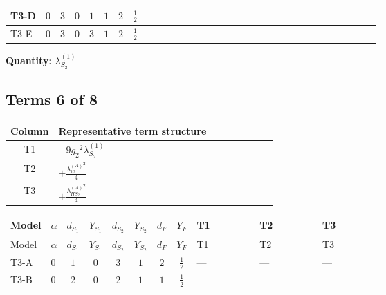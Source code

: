 \documentclass[8pt]{article}
\begin{document}
\begin{landscape}
\begin{longtable}{@{}llcccccc >{\raggedright\arraybackslash}p{0.21\linewidth} >{\raggedright\arraybackslash}p{0.21\linewidth} >{\raggedright\arraybackslash}p{0.21\linewidth}@{}}
\midrule
T3-D & $0$ & $3$ & $0$ & $1$ & $1$ & $2$ & $\frac{1}{2}$ & \scriptsize\adjustbox{max width=\linewidth}{$\begin{gathered} 8 {\lambda_{S_2}^{(1)}} T_{\nu}^{(2)}\end{gathered}$} & --- & --- \\
\midrule
T3-E & $0$ & $3$ & $0$ & $3$ & $1$ & $2$ & $\frac{1}{2}$ & --- & --- & --- \\
\midrule
\bottomrule
\end{longtable}
\clearpage
\noindent\textbf{Quantity: }$\lambda_{S_2}^{(1)}$\par\smallskip
\subsection*{Terms 6 of 8}
\begin{center}
\begin{tabular}{@{}c >{\raggedright\arraybackslash}p{0.82\linewidth}@{}}
\toprule
Column & Representative term structure \\
\midrule
T1 & \(\displaystyle -9 {g_2}^2 {\lambda_{S_2}^{(1)}}\) \\
\midrule
T2 & \(\displaystyle +\frac{{\lambda_{12}^{(A)}}^2}{4}\) \\
\midrule
T3 & \(\displaystyle +\frac{{\lambda_{HS_2}^{(A)}}^2}{4}\) \\
\midrule
\bottomrule
\end{tabular}
\end{center}
\smallskip
\tiny
\begin{longtable}{@{}llcccccc >{\raggedright\arraybackslash}p{0.21\linewidth} >{\raggedright\arraybackslash}p{0.21\linewidth} >{\raggedright\arraybackslash}p{0.21\linewidth}@{}}
\toprule
Model & $\alpha$ & $d_{S_1}$ & $Y_{S_1}$ & $d_{S_2}$ & $Y_{S_2}$ & $d_F$ & $Y_F$ & T1 & T2 & T3 \\
\midrule
\endfirsthead
\toprule
Model & $\alpha$ & $d_{S_1}$ & $Y_{S_1}$ & $d_{S_2}$ & $Y_{S_2}$ & $d_F$ & $Y_F$ & T1 & T2 & T3 \\
\midrule
\endhead
T3-A & $0$ & $1$ & $0$ & $3$ & $1$ & $2$ & $\frac{1}{2}$ & --- & --- & --- \\
\midrule
T3-B & $0$ & $2$ & $0$ & $2$ & $1$ & $1$ & $\frac{1}{2}$ & \scriptsize\adjustbox{max width=\linewidth}{$\begin{gathered} -9 {g_2}^2 {\lambda_{S_2}^{(1)}}\end{gathered}$} & \scriptsize\adjustbox{max width=\linewidth}{$\begin{gathered} +\frac{{\lambda_{12}^{(A)}}^2}{4}\end{gathered}$} & \scriptsize\adjustbox{max width=\linewidth}{$\begin{gathered} +\frac{{\lambda_{HS_2}^{(A)}}^2}{4}\end{gathered}$} \\

\end{longtable}
\end{landscape}
\end{document}

